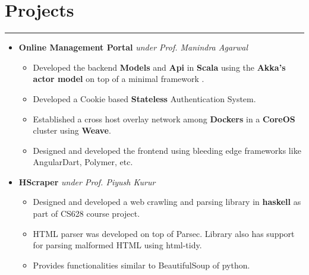 \documentclass[a4paper]{article}
\begin{document}
\section*{Projects}
\hrule
\vspace{3mm}
  \begin{itemize}
  \item
   \textbf{Online Management Portal}
         \hfill \textit{under Prof. Manindra Agarwal}
  \begin{itemize}
      \item Developed the backend \textbf{Models} and \textbf{Api} in \textbf{Scala} using the \textbf{Akka's actor model} on top of a minimal framework .\\
      \setlength\itemsep{-1em}
       \item Developed a Cookie based \textbf{Stateless} Authentication System.\\
       \item Established a cross host overlay network among \textbf{Dockers} in a \textbf{CoreOS}
           cluster using \textbf{Weave}.\\
       \item Designed and developed the frontend using bleeding edge frameworks like AngularDart, Polymer, etc.\\
    \end{itemize}

   \item 
    \textbf{HScraper}
    \hfill \textit{under Prof. Piyush Kurur}
    
	\begin{itemize}
      \setlength\itemsep{-1em}
      \item Designed and developed a web crawling and parsing library in \textbf{haskell} as part of CS628 course project. \\
        \item HTML parser was developed on top of Parsec. Library also has support for parsing malformed HTML using html-tidy.\\
        \item Provides functionalities similar to BeautifulSoup of python.\\
    \end{itemize}


\end{itemize}
\end{document}
